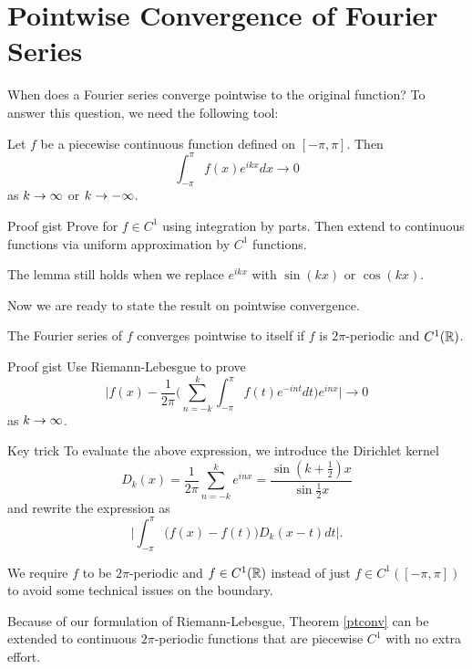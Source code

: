 \section{Pointwise Convergence of Fourier Series}
When does a Fourier series converge pointwise to the original function? To answer this question, we need the following tool:
\begin{lem}
    Let $f$ be a piecewise continuous function defined on $[-\pi,\pi]$. Then
    \[
        \int_{-\pi}^\pi f(x)e^{ikx}dx \rightarrow 0
    \]
    as $k \rightarrow \infty$ or $k \rightarrow -\infty$.
\end{lem}
\begin{details}{Proof gist}
    Prove for $f \in C^1$ using integration by parts. Then extend to continuous functions via uniform approximation by $C^1$ functions.
\end{details}
\begin{remark}
    The lemma still holds when we replace $e^{ikx}$ with $\sin(kx)$ or $\cos(kx)$.
\end{remark}
Now we are ready to state the result on pointwise convergence.
\begin{thm}
    \label{ptconv}
    The Fourier series of $f$ converges pointwise to itself if $f$ is $2\pi$-periodic and $C^1({\mathbb R})$.
\end{thm}
\begin{details}{Proof gist}
    Use Riemann-Lebesgue to prove
    \[
        \Big| f(x) - \frac{1}{2\pi}\Big(\sum_{n=-k}^k \int_{-\pi}^\pi f(t)e^{-int}dt\Big)
        e^{inx}\Big| \rightarrow 0
    \]
    as $k \rightarrow \infty$.
\end{details}
\begin{details}{Key trick}
    To evaluate the above expression, we introduce the Dirichlet kernel
    \[
        D_k(x) = \frac{1}{2\pi} \sum^{k}_{n=-k}e^{inx} = \frac{\sin(k+ \frac{1}{2})x}{\sin \frac{1}{2}x}
    \]
    and rewrite the expression as
    \[
        \Big|\int_{-\pi}^\pi \big(f(x)-f(t)\big) D_k(x-t)dt\Big|.
    \]
\end{details}
\begin{remark}
    We require $f$ to be $2\pi$-periodic and $f \in C^1({\mathbb R})$ instead of just $f \in C^1([-\pi,\pi])$ to avoid some technical issues on the boundary.
\end{remark}
\begin{remark}
    Because of our formulation of Riemann-Lebesgue, Theorem \ref{ptconv} can be extended to continuous $2\pi$-periodic functions that are piecewise $C^1$ with no extra effort.
\end{remark}

